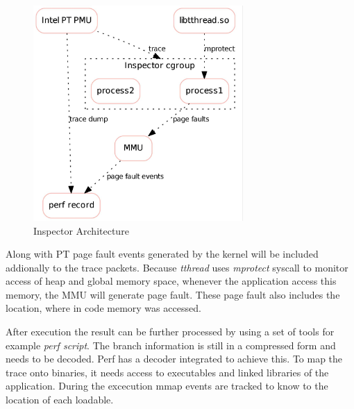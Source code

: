 \begin{figure}[h]
\includegraphics[width=8cm]{figure/arch2.jpg}
\caption{Inspector Architecture}
\label{fig:inspector}
\end{figure}

Along with PT page fault events generated by the kernel will be included
addionally to the trace packets. Because \emph{tthread} uses \emph{mprotect}
syscall to monitor access of heap and global memory space, whenever the
application access this memory, the MMU will generate page fault. These
page fault also includes the location, where in code memory was accessed.

After execution the result can be further processed by using a set of tools
for example \emph{perf script}. The branch information is still in a compressed
form and needs to be decoded. Perf has a decoder integrated to achieve this.
To map the trace onto binaries, it needs access to executables and linked
libraries of the application. During the excecution mmap events are tracked to
know to the location of each loadable.

